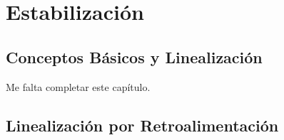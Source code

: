 \chapter{Estabilización}
\section{Conceptos Básicos y Linealización}

Me falta completar este capítulo.

\section{Linealización por Retroalimentación}

